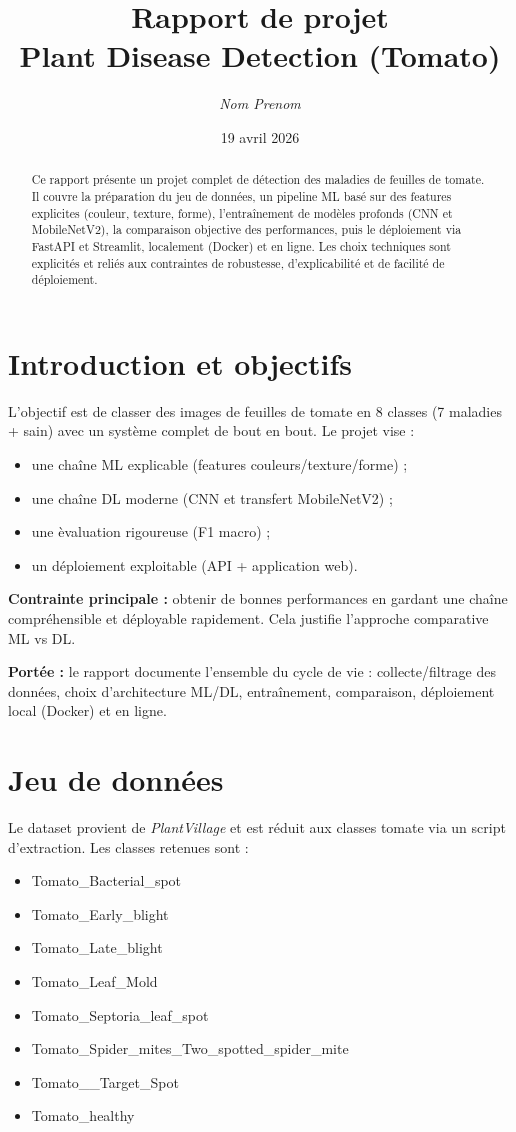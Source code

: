 \documentclass[12pt,a4paper]{article}
\title{Rapport de projet\\Plant Disease Detection (Tomato)}
\author{\textit{Nom Prenom}}
\date{19 avril 2026}
\begin{document}
\maketitle

\begin{abstract}
Ce rapport pr\'esente un projet complet de d\'etection des maladies de feuilles de tomate. Il couvre la pr\'eparation du jeu de donn\'ees, un pipeline ML bas\'e sur des features explicites (couleur, texture, forme), l'entra\^inement de mod\`eles profonds (CNN et MobileNetV2), la comparaison objective des performances, puis le d\'eploiement via FastAPI et Streamlit, localement (Docker) et en ligne. Les choix techniques sont explicit\'es et reli\'es aux contraintes de robustesse, d'explicabilit\'e et de facilit\'e de d\'eploiement.
\end{abstract}

\section{Introduction et objectifs}
L'objectif est de classer des images de feuilles de tomate en 8 classes (7 maladies + sain) avec un syst\`eme complet de bout en bout. Le projet vise :
\begin{itemize}[leftmargin=*]
    \item une cha\^ine ML explicable (features couleurs/texture/forme) ;
    \item une cha\^ine DL moderne (CNN et transfert MobileNetV2) ;
    \item une \`evaluation rigoureuse (F1 macro) ;
    \item un d\'eploiement exploitable (API + application web).
\end{itemize}

\textbf{Contrainte principale :} obtenir de bonnes performances en gardant une cha\^ine compr\'ehensible et d\'eployable rapidement. Cela justifie l'approche comparative ML vs DL.

\textbf{Port\'ee :} le rapport documente l'ensemble du cycle de vie : collecte/filtrage des donn\'ees, choix d'architecture ML/DL, entra\^inement, comparaison, d\'eploiement local (Docker) et en ligne.

\section{Jeu de donn\'ees}
Le dataset provient de \textit{PlantVillage} et est r\'eduit aux classes tomate via un script d'extraction. Les classes retenues sont :
\begin{itemize}[leftmargin=*]
    \item Tomato\_Bacterial\_spot
    \item Tomato\_Early\_blight
    \item Tomato\_Late\_blight
    \item Tomato\_Leaf\_Mold
    \item Tomato\_Septoria\_leaf\_spot
    \item Tomato\_Spider\_mites\_Two\_spotted\_spider\_mite
    \item Tomato\_\_Target\_Spot
    \item Tomato\_healthy
\end{itemize}
\end{document}
